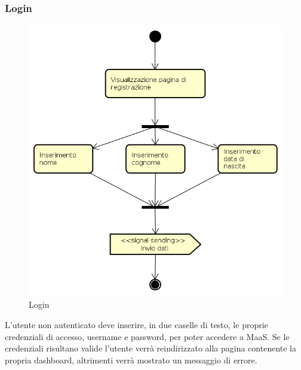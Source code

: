 \subsubsection{Login}
\begin{figure}[H]
\begin{center}
\includegraphics[height=12cm]{res/sections/backend/activities/registrazione.png}
\caption{Login}
\end{center}
\end{figure}
L'utente non autenticato deve inserire, in due caselle di testo, le proprie credenziali di accesso, username e password, per poter accedere a MaaS. Se le credenziali risultano valide l'utente verrà reindirizzato alla pagina contenente la propria dashboard, altrimenti verrà mostrato un messaggio di errore.
